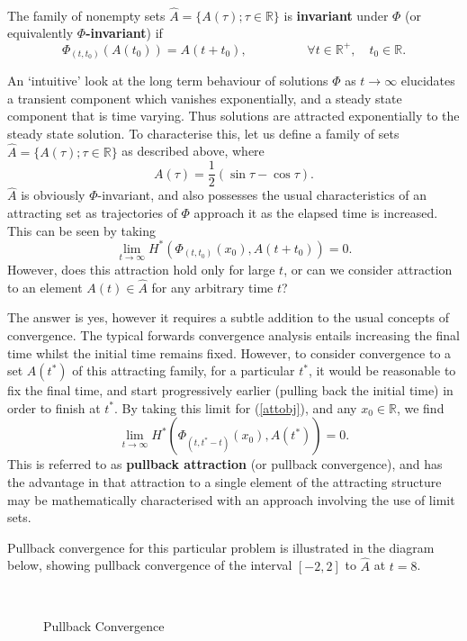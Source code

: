 \begin{defn} \hfill \\
The family of nonempty sets $\hat{A} = \{ A(\tau) ; \tau \in \mathbb{R}
\}$ is {\bf invariant} under $\Phi$ (or equivalently {\bf
$\Phi$-invariant})  if
\[ \Phi_{(t,t_0)}(A(t_0)) = A(t+t_0), \hspace{2cm} \forall t \in
                \mathbb{R}^+, \quad t_0 \in \mathbb{R}. \]
\end{defn}

An `intuitive' look at the long term behaviour of solutions $\Phi$
as $t \rightarrow \infty$ elucidates a transient component which
vanishes exponentially, and a steady state component that is time
varying. Thus solutions are attracted exponentially to the steady
state solution. To characterise this, let us define a family of
sets $\hat{A} = \{A(\tau); \tau \in \mathbb{R} \}$ as described
above, where
\begin{equation}\label{ssobj}
  A(\tau) = \frac{1}{2} \left(\sin \tau - \cos \tau \right).
\end{equation}
$\hat{A}$ is obviously $\Phi$-invariant, and also possesses the
usual characteristics of an attracting set as trajectories of
$\Phi$ approach it as the elapsed time is increased. This can be
seen by taking
\[ \lim_{t \rightarrow \infty} H^*(\Phi_{(t,t_0)}(x_0),A(t+t_0))=0. \]
However, does this attraction hold only for large $t$, or can we consider
attraction to an element $A(t) \in \hat{A}$ for any arbitrary time $t$?

The answer is yes, however it requires a subtle addition to the usual
concepts of convergence. The typical forwards convergence analysis
entails increasing the final time whilst the initial time remains fixed.
However, to consider convergence to a set $A(t^*)$ of this attracting
family, for a particular $t^*$, it would be reasonable to fix the final
time, and start progressively earlier (pulling back the initial time) in
order to finish at $t^*$.  By taking this limit for (\ref{attobj}), and any
$x_0 \in \mathbb{R}$, we find
\[ \lim_{t \rightarrow \infty} H^*(\Phi_{(t,t^*-t)}(x_0),A(t^*))=0. \]
This is referred to as {\bf pullback attraction} (or pullback
convergence), and  has the advantage in that attraction to a single element of
the attracting structure may be mathematically characterised with an approach
involving the use of limit sets.

Pullback convergence for this particular problem is illustrated in
the diagram below, showing pullback convergence of the interval
$[-2, 2]$ to $\hat{A}$ at $t = 8$.

\begin{figure}[htb]
\begin{center}
\leavevmode
\hbox{
\epsfxsize=9.5cm
  }%
\protect\caption{Pullback Convergence}\protect\label{pbeg}
\end{center}
\end{figure}

\endinput
